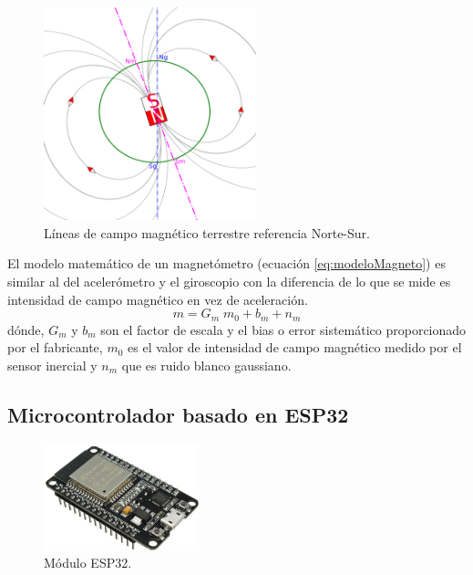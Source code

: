 \begin{itemize}
		\begin{figure}[H]
			\centering
			\includegraphics[width=0.55\textwidth]{./img/IMUmagneto}
			\caption{Líneas de campo magnético terrestre referencia Norte-Sur. \cite{juanDiego}} 
			\label{fig:campoMag}
		\end{figure} 
		
		El modelo matemático de un magnetómetro (ecuación \ref{eq:modeloMagneto}) es similar al del acelerómetro y el giroscopio con la diferencia de lo que se mide es intensidad de campo magnético en vez de aceleración. 
		\begin{equation}
			\label{eq:modeloMagneto}
			m = G_{m}\; m_{0} + b_{m} + n_{m}
		\end{equation}
		dónde, $ G_{m} $ y $ b_{m} $ son el factor de escala y el bias o error sistemático proporcionado por el fabricante, $m_{0} $ es el valor de intensidad de campo magnético medido por el sensor inercial y $ n_{m} $ que es ruido blanco gaussiano.
		
		
		
	\end{itemize}
	


\subsection{Microcontrolador basado en ESP32}
\label{sec:esp324}

	\begin{figure}[H]
		\centering
		\includegraphics[width=0.4\textwidth]{./img/esp32}
		\caption{Módulo ESP32. } 
		\label{fig:esp32}
	\end{figure} 


